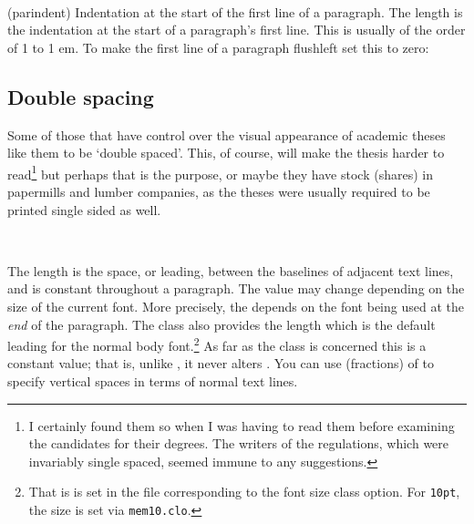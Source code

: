 \begin{syntax}
\lnc{\parindent} \\
\end{syntax}
\glossary(parindent)%
  {}
  {Indentation at the start of the first line of a paragraph.}
The length \lnc{\parindent} is the indentation at the start of a paragraph's
first line. This is usually of the order of 1 to 1 em.
To make the first line of a paragraph flushleft set this to zero:
\begin{lcode}
\setlength{\parindent}{0pt}
\end{lcode}

\subsection{Double spacing}


    Some of those that have control over the visual appearance of academic
theses like them to be `double spaced'. This, of course, will make the thesis
harder to read\footnote{I certainly found them so when I was having to read
them before examining the candidates for their degrees. The writers of the
regulations, which were invariably single spaced, seemed immune to any
suggestions.} but perhaps that is the purpose, or maybe they have stock
(shares) in papermills and lumber companies, as the theses were usually 
required to be printed single sided as well.

\begin{syntax}
\lnc{\baselineskip} \lnc{\onelineskip} \\
\end{syntax}
The length \lnc{\baselineskip} is the space, or 
leading, between the baselines of adjacent text lines, 
and is constant
throughout a paragraph. The value  may change
depending on the size of the current font. More precisely, the 
\cmd{\baselineskip} depends on the font being used at the \emph{end} of 
the paragraph. The class also provides the length \lnc{\onelineskip}
which is the default leading for the normal body font.\footnote{That
  is \cmd{\onelineskip} is set in the  file
  corresponding to the font size class option. For \texttt{10pt}, the
  size is set via \texttt{mem10.clo}.} As far as the class
is concerned this is a constant value; that is, unlike \lnc{\baselineskip},
it never alters \lnc{\onelineskip}. You can use (fractions) of 
\lnc{\onelineskip} to specify vertical spaces in terms of normal text 
lines.

